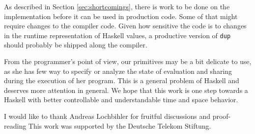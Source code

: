 \documentclass[preprint]{sigplanconf}
\theoremstyle{nonumberplain}
\newcommand{\li}{\lstinline[style=Haskell]}
\begin{document}
As described in Section \ref{sec:shortcomings}, there is work to be done on the implementation before it can be used in production code. Some of that might require changes to the compiler code. Given how sensitive the code is to changes in the runtime representation of Haskell values, a productive version of \li-dup- should probably be shipped along the compiler.

From the programmer’s point of view, our primitives may be a bit delicate to use, as she has few way to specify or analyze the state of evaluation and sharing during the execution of her program. This is a general problem of Haskell and deserves more attention in general. We hope that this work is one step towards a Haskell with better controllable and understandable time and space behavior.


\acks

I would like to thank Andreas Lochbihler for fruitful discussions and proof-reading This work was supported by the Deutsche Telekom Stiftung.



\end{document}
